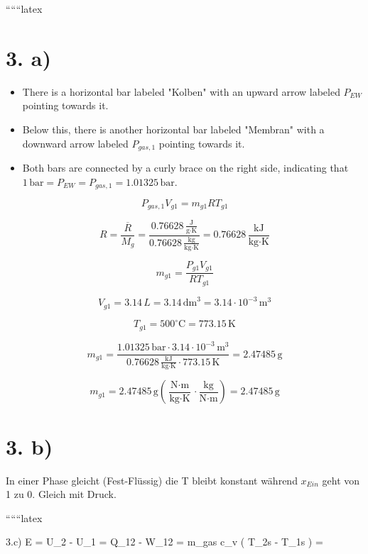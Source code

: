 
``````latex


\section*{3. a)}

\begin{itemize}
    \item There is a horizontal bar labeled "Kolben" with an upward arrow labeled $P_{EW}$ pointing towards it.
    \item Below this, there is another horizontal bar labeled "Membran" with a downward arrow labeled $P_{gas,1}$ pointing towards it.
    \item Both bars are connected by a curly brace on the right side, indicating that $1 \, \text{bar} = P_{EW} = P_{gas,1} = 1.01325 \, \text{bar}$.
\end{itemize}

\[
P_{gas,1} V_{g1} = m_{g1} R T_{g1}
\]

\[
R = \frac{\overline{R}}{M_g} = \frac{0.76628 \, \frac{\text{J}}{\text{g} \cdot \text{K}}}{0.76628 \, \frac{\text{kg}}{\text{kg} \cdot \text{K}}} = 0.76628 \, \frac{\text{kJ}}{\text{kg} \cdot \text{K}}
\]

\[
m_{g1} = \frac{P_{g1} V_{g1}}{R T_{g1}}
\]

\[
V_{g1} = 3.14 \, L = 3.14 \, \text{dm}^3 = 3.14 \cdot 10^{-3} \, \text{m}^3
\]

\[
T_{g1} = 500^\circ \text{C} = 773.15 \, \text{K}
\]

\[
m_{g1} = \frac{1.01325 \, \text{bar} \cdot 3.14 \cdot 10^{-3} \, \text{m}^3}{0.76628 \, \frac{\text{kJ}}{\text{kg} \cdot \text{K}} \cdot 773.15 \, \text{K}} = 2.47485 \, \text{g}
\]

\[
m_{g1} = 2.47485 \, \text{g} \left( \frac{\text{N} \cdot \text{m}}{\text{kg} \cdot \text{K}} \cdot \frac{\text{kg}}{\text{N} \cdot \text{m}} \right) = 2.47485 \, \text{g}
\]

\section*{3. b)}

In einer Phase gleicht (Fest-Flüssig) die T bleibt konstant während $x_{Ein}$ geht von 1 zu 0. Gleich mit Druck.

``````latex

3.c) \quad \Delta E = U_2 - U_1 = Q_{12} - W_{12} = m_{gas} \cdot c_v \left( T_{2s} - T_{1s} \right) = 

